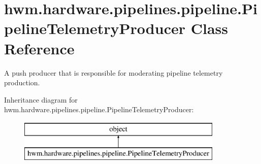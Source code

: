 \hypertarget{classhwm_1_1hardware_1_1pipelines_1_1pipeline_1_1_pipeline_telemetry_producer}{\section{hwm.\-hardware.\-pipelines.\-pipeline.\-Pipeline\-Telemetry\-Producer Class Reference}
\label{classhwm_1_1hardware_1_1pipelines_1_1pipeline_1_1_pipeline_telemetry_producer}
}


A push producer that is responsible for moderating pipeline telemetry production.  


Inheritance diagram for hwm.\-hardware.\-pipelines.\-pipeline.\-Pipeline\-Telemetry\-Producer\-:\begin{figure}[H]
\begin{center}
\leavevmode
\includegraphics[height=2.000000cm]{classhwm_1_1hardware_1_1pipelines_1_1pipeline_1_1_pipeline_telemetry_producer}
\end{center}
\end{figure}
